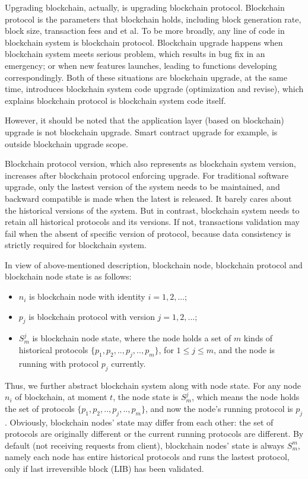 \documentclass[sigplan,screen]{acmart}
\begin{document}
Upgrading blockchain, actually, is upgrading blockchain protocol.
Blockchain protocol is the parameters that blockchain holds, including block
generation rate, block size, transaction fees and et al. To be
more broadly, any line of code in blockchain system is blockchain protocol.
Blockchain upgrade happens when blockchain system meets serious problem,
which results in bug fix in an emergency; or when new features launches,
leading to functions developing correspondingly. Both of these situations
are blockchain upgrade, at the same time, introduces blockchain system code
upgrade (optimization and revise), which explains blockchain protocol is
blockchain system code itself.

However, it should be noted that the application layer (based on blockchain)
upgrade is not blockchain upgrade. Smart contract upgrade for
example, is outside blockchain upgrade scope.

Blockchain protocol version, which also represents as blockchain system
version, increases after blockchain protocol enforcing upgrade. For traditional
software upgrade, only the lastest version of the system needs to be
maintained, and backward compatible is made when the latest is
released. It barely cares about the historical versions of the system. But in
contrast, blockchain system needs to retain all historical protocols and its
versions. If not, transactions validation may fail when the absent of specific
version of protocol, because data consistency is strictly required for
blockchain system.

In view of above-mentioned description, blockchain node, blockchain protocol
and blockchain node state is as follows:
\begin{itemize}
  \item $n_i$ is blockchain node with identity $i=1,2,...$;
  \item $p_j$ is blockchain protocol with version $j=1,2,...$;
  \item $S_{m}^{j}$ is blockchain node state, where the node holds a set of $m$
    kinds of historical protocols $\{p_1,p_2,..,p_j,..,p_m\}$, for
    $1{\leq}j{\leq}m$, and the node is running with protocol $p_j$ currently.
\end{itemize}

Thus, we further abstract blockchain system along with node state.
For any node $n_i$ of blockchain, at moment $t$,
the node state is $S_{m}^{j}$, which means the node holds the set of protocols
$\{p_1,p_2,..,p_j,..,p_m\}$, and now the node's running protocol is $p_j$.
Obviously, blockchain nodes' state may differ from each other: the set of
protocols are originally different or the current running protocols are
different. By default (not receiving requests from client),
blockchain nodes' state is always $S_{m}^{m}$, namely each node has entire
historical protocols and runs the lastest protocol, only if last irreversible
block (LIB) has been validated.
\end{document}
